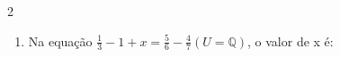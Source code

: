 \documentclass[a4paper,14pt]{article}
\begin{document}
\begin{multicols}{2}
\begin{enumerate}
\begin{enumerate}[a)]
    			\item $\frac{3}{7} - \frac{x}{2} = 1$ \\\\\\\\\\\\\\\\\\\\\\\\
    			\item $\frac{2}{5}x - \frac{5}{2} = 0$ \\\\\\\\\\\\\\\\\\\\\\\\
    			\item $\frac{x + 2}{3} - \frac{3x - 1}{5} = \frac{x}{2}$ \\\\\\\\\\\\\\\\\\\\\\\\
    			\item $\frac{x}{3} - 5 - \frac{2 - x}{4} = \frac{3x}{2}$  \\\\\\\\\\\\\\\\\\\\\\\\
    		\end{enumerate}
    		\item Na equação $\frac{1}{3} - 1 + x = \frac{5}{6} - \frac{4}{7} (U = \mathbb{Q})$, o valor de x é:

\end{enumerate}
\end{multicols}
\end{document}
